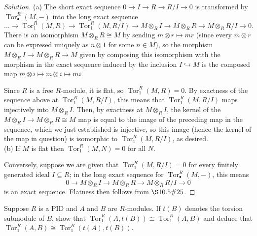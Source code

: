 \documentclass[10pt]{article}
\providecommand{\tensor}{\otimes}
\providecommand{\tor}{\operatorname{Tor}}
\newenvironment{soln}{\begin{proof}[Solution]}{\end{proof}}
\begin{document}
\begin{soln}
    (a) The short exact sequence $0\to I\to R\to R/I\to 0$
    is transformed by $\tor_\bullet^R(M,-)$ into the long exact sequence
    \begin{equation*}
        \dots\to\tor_1^R(M,R)\to\tor_1^R(M,R/I)\to
	M\tensor_RI\to M\tensor_RR\to M\tensor_R R/I\to 0.
    \end{equation*}
    There is an isomorphism $M\tensor_RR\cong M$ by sending
    $m\tensor r\mapsto mr$ (since every $m\tensor r$
    can be expresed uniquely as $n\tensor 1$ for some $n\in M$),
    so the morphism $M\tensor_RI\to M\tensor_RR\to M$
    given by composing this isomorphism with the
    morphism in the exact sequence induced by the inclusion
    $I\hookrightarrow M$ is the composed map
    $m\tensor i\mapsto m\tensor i\mapsto mi$.

    Since $R$ is a free $R$-module, it is flat,
    so $\tor_1^R(M,R) = 0$. By exactness of the sequence above
    at $\tor_1^R(M,R/I)$, this means that $\tor_1^R(M,R/I)$ maps injectively
    into $M\otimes_R I$. Then, by exactness at $M\tensor_R I$,
    the kernel of the $M\tensor_RI\to M\tensor_RR\cong M$ map
    is equal to the image of the preceding map in the sequence,
    which we just established is injective,
    so this image (hence the kernel of the map in question)
    is isomorphic to $\tor_1^R(M,R/I)$, as desired.
    \\

    (b) If $M$ is flat then $\tor_1^R(M,N) = 0$ for all $N$.

    Conversely, suppose we are given that
    $\tor_1^R(M,R/I) = 0$ for every finitely generated ideal $I\subseteq R$;
    in the long exact sequence for $\tor_\bullet^R(M,-)$, this means
    \begin{equation*}
        0\to M\tensor_R I\to M\tensor_RR\to M\tensor_RR/I\to 0
    \end{equation*}
    is an exact sequence. Flatness then follows from $\S10.5\#25$.
\end{soln}

\begin{problem}
    [\S17.1\#16]
    Suppose $R$ is a PID and $A$ and $B$ are $R$-modules.
    If $t(B)$ denotes the torsion submodule of $B$, show that
    $\tor_1^R(A,t(B))\cong\tor_1^R(A,B)$ and deduce that
    $\tor_1^R(A,B)\cong\tor_1^R(t(A),t(B))$.
\end{problem}
\end{document}
